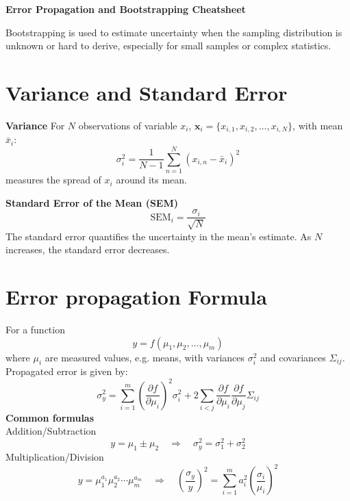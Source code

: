 \documentclass[10pt]{article}
\begin{document}
\begin{center}
    {\Large \textbf{Error Propagation and Bootstrapping Cheatsheet}}\\[4pt]
\end{center}
Bootstrapping is used to estimate uncertainty when the sampling distribution is unknown or hard to derive, especially for small samples or complex statistics.
\begin{multicols*}{2}
\raggedcolumns

\section*{Variance and Standard Error}

\noindent
\textbf{Variance}
For \( N \) observations of variable \( x_i \),
\(\mathbf{x}_i = \{ x_{i,1}, x_{i,2}, \ldots, x_{i,N} \}\), with mean \(\bar{x}_i\):
\[
\sigma_i^2 = \frac{1}{N - 1} \sum_{n=1}^{N} (x_{i,n} - \bar{x}_i)^2
\]
measures the spread of \( x_i \) around its mean.



\textbf{Standard Error of the Mean (SEM)}
\begin{equation}
\mathrm{SEM}_{i} = \frac{\sigma_i}{\sqrt{N}}
\end{equation}
The standard error quantifies the uncertainty in the mean's estimate. As \( N \) increases, the standard error decreases.

\section*{Error propagation Formula}


For a function 
\[
y = f(\mu_1, \mu_2, \ldots, \mu_m)
\]
where $\mu_i$ are measured values, e.g. means, with variances $\sigma_{i}^2$ and covariances $\Sigma_{ij}$. Propagated error is given by:
\[
\sigma_y^2 =
\sum_{i=1}^{m}
\left(
\frac{\partial f}{\partial \mu_i}
\right)^2
\sigma_{i}^2
+ 2 \sum_{i<j}
\frac{\partial f}{\partial \mu_i}
\frac{\partial f}{\partial \mu_j}
\Sigma_{ij}
\]
\textbf{Common formulas}\\[3pt]
Addition/Subtraction
\[
y = \mu_1 \pm \mu_2
\quad \Rightarrow \quad
\sigma_y^2 = \sigma_{1}^2 + \sigma_{2}^2
\]
Multiplication/Division
\[
y = \mu_1^{a_1} \mu_2^{a_2} \cdots \mu_m^{a_m}
\quad \Rightarrow \quad
\left( \frac{\sigma_y}{y} \right)^2 =
\sum_{i=1}^{m}
a_i^2
\left(
\frac{\sigma_{i}}{\mu_i}
\right)^2
\]



\end{multicols*}
\end{document}

